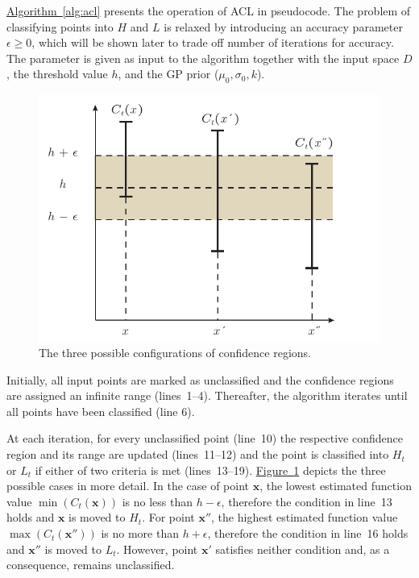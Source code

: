 \documentclass{article}
\def\*#1{\bm{#1}}
\newcommand{\figref}[1]{\hyperref[#1]{\mbox{Figure~\ref*{#1}}}}
\newcommand{\algoref}[1]{\hyperref[#1]{\mbox{Algorithm~\ref*{#1}}}}
\begin{document}
\algoref{alg:acl} presents the operation of ACL in pseudocode. The problem
of classifying points into $H$ and $L$ is relaxed by introducing an
accuracy parameter $\epsilon \geq 0$, which will be shown later to trade off
number of iterations for accuracy. The parameter is given as
input to the algorithm together with the input space $D$, the threshold value
$h$, and the GP prior ($\mu_0, \sigma_0, k$).

\begin{figure}[tb]
\begin{center}
\centerline{\includegraphics[width=\columnwidth]{figures/class}}
\caption{The three possible configurations of confidence regions.}
\label{fig:class}
\end{center}
\end{figure} 

Initially, all input points are marked as unclassified and the
confidence regions are assigned an infinite range (lines~1--4). Thereafter,
the algorithm iterates until all points have been classified (line 6).

At each iteration, for every unclassified point
(line~10) the respective confidence region and its range are updated
(lines~11--12) and the point is classified into $H_t$ or $L_t$ if either
of two criteria is met (lines~13--19). \figref{fig:class} depicts the
three possible cases in more detail. In the case of point $\*x$,
the lowest estimated function value $\min(C_t(\*x))$ is no less
than $h-\epsilon$, therefore the condition in line~13 holds and $\*x$
is moved to $H_t$. For point $\*x''$, the highest estimated
function value $\max(C_t(\*x''))$ is no more than $h+\epsilon$,
therefore the condition in line~16 holds and $\*x''$ is moved to $L_t$.
However, point $\*x'$ satisfies neither condition and, as a consequence,
remains unclassified.
\end{document}
